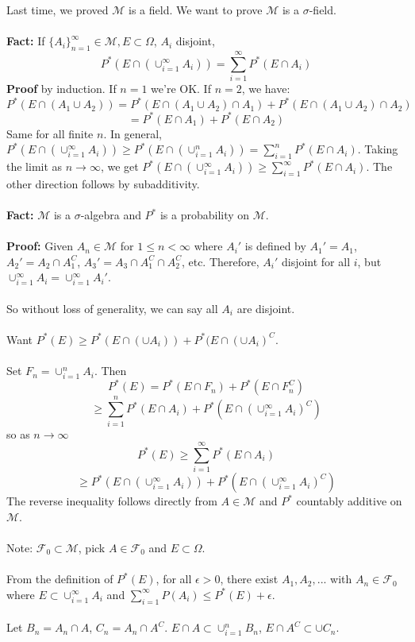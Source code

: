 \documentclass[12pt]{article}
\begin{document}
Last time, we proved $\mathcal{M}$ is a field.  We want to prove $\mathcal{M}$ is a $\sigma$-field.
\\ \\
{\bf Fact:} If $\{ A_i \}_{n=1}^\infty \in \mathcal{M}, E \subset \Omega$, $A_i$ disjoint,
$$P^*(E \cap (\cup_{i=1}^\infty A_i)) = \sum_{i=1}^\infty P^*(E \cap A_i)$$
{\bf Proof} by induction.  If $n = 1$ we're OK.  If $n = 2$, we have:
$$P^*(E \cap (A_1 \cup A_2)) = P^*(E \cap (A_1 \cup A_2) \cap A_1) + P^*(E \cap (A_1 \cup A_2) \cap A_2)$$
$$ = P^*(E \cap A_1) + P^*(E \cap A_2)$$
Same for all finite $n$.  In general, $P^*(E \cap (\cup_{i=1}^
\infty A_i)) \ge P^*(E \cap (\cup_{i=1}^n A_i)) = \sum_{i=1}^n P^*(E \cap A_i)$.  Taking the limit as $n \to \infty$, we get $P^*(E \cap (\cup_{i=1}^\infty A_i)) \ge \sum_{i=1}^\infty P^*(E \cap A_i)$.  The other direction follows by subadditivity.
\\ \\
{\bf Fact:} $\mathcal{M}$ is a $\sigma$-algebra and $P^*$ is a probability on $\mathcal{M}$.
\\ \\
{\bf Proof:}
Given $A_n \in \mathcal{M}$ for $1 \le n < \infty$ where $A_i'$ is defined by $A_1' = A_1$, $A_2' = A_2 \cap A_1^C$, $A_3' = A_3 \cap A_1^C \cap A_2^C$, etc.  Therefore, $A_i'$ disjoint for all $i$, but $\cup_{i=1}^\infty A_i = \cup_{i=1}^\infty A_i'$.
\\ \\
So without loss of generality, we can say all $A_i$ are disjoint.
\\ \\
Want $P^*(E) \ge P^*(E \cap (\cup A_i)) + P^*(E \cap (\cup A_i)^C$.
\\ \\
Set $F_n = \cup_{i=1}^n A_i$.  Then 
$$P^*(E) = P^*(E \cap F_n) + P^*(E \cap F_n^C)$$
$$ \ge \sum_{i=1}^n  P^*(E \cap A_i) + P^*(E \cap (\cup_{i=1}^\infty A_i)^C)$$
so as $n \to \infty$
$$P^*(E) \ge \sum_{i=1}^\infty P^*(E \cap A_i)$$
$$ \ge P^*(E \cap (\cup_{i=1}^\infty A_i)) + P^*(E \cap (\cup_{i=1}^\infty A_i)^C)$$
The reverse inequality follows directly from $A \in \mathcal{M}$ and $P^*$ countably additive on $\mathcal{M}$.
\\ \\
Note: $\mathcal{F}_0 \subset \mathcal{M}$, pick $A \in \mathcal{F}_0$ and $E \subset \Omega$.
\\ \\
From the definition of $P^*(E)$, for all $\epsilon > 0$, there exist $A_1, A_2, ...$ with $A_n \in \mathcal{F}_0$ where $E \subset \cup_{i=1}^\infty A_i$ and $\sum_{i=1}^\infty P(A_i) \le P^*(E) + \epsilon$.
\\ \\
Let $B_n = A_n \cap A$, $C_n = A_n \cap A^C$.  $E \cap A \subset \cup_{i=1}^n B_n$, $E \cap A^C \subset \cup C_n$.
\end{document}
